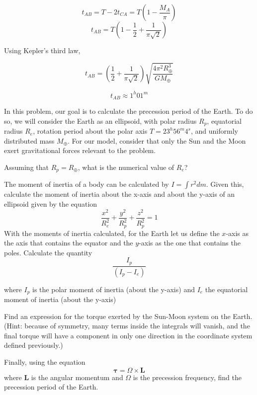 \documentclass[11pt]{article}
\begin{document}
\begin{pproblem}
\begin{pssolution*}{}{}
\begin{alternativas}
            \[t_{AB} = T - 2t_{CA} = T\left(1 - \frac{M_A}{\pi}\right)\]
            \[t_{AB} = T\left(1-\frac{1}{2}+\frac{1}{\pi\sqrt2}\right)\]

            Using Kepler's third law,

            \[t_{AB} = \left(\frac{1}{2}+\frac{1}{\pi\sqrt2}\right)\sqrt{\frac{4\pi^2R_{\oplus}^3}{GM_\oplus}} \]

            \[\boxed{t_{AB} \approx 1^h01^m}\]
            
      
        \end{alternativas}
    \end{pssolution*}
    
\end{pproblem}

\begin{pproblem}
    In this problem, our goal is to calculate the precession period of the Earth. To do so, we will consider the Earth as an ellipsoid, with polar radius $R_p$, equatorial radius $R_e$, rotation period about the polar axis $T = 23^h56^m4^s$, and uniformly distributed mass $M_\oplus$. For our model, consider that only the Sun and the Moon exert gravitational forces relevant to the problem.
    \begin{alternativas}
        \item Assuming that $R_p = R_\oplus$, what is the numerical value of $R_e$?
        
        \item The moment of inertia of a body can be calculated by $I = \int r^2 dm$. Given this, calculate the moment of inertia about the x-axis and about the y-axis of an ellipsoid given by the equation 
        $$\frac{x^2}{R_e^2} + \frac{y^2}{R_p^2} + \frac{z^2}{R_p^2}= 1$$
        With the moments of inertia calculated, for the Earth let us define the $x$-axis as the axis that contains the equator and the $y$-axis as the one that contains the poles. Calculate the quantity 
        $$\frac{I_p}{(I_p-I_e)}$$

        where $I_p$ is the polar moment of inertia (about the y-axis) and $I_e$ the equatorial moment of inertia (about the y-axis)
        

        \item Find an expression for the torque exerted by the Sun-Moon system on the Earth. (Hint: because of symmetry, many terms inside the integrals will vanish, and the final torque will have a component in only one direction in the coordinate system defined previously.)
        \item Finally, using the equation 
        $$\mathbf{\tau } = \Omega \times \mathbf{L} $$
        where $\mathbf{L}$ is the angular momentum and $\Omega$ is the precession frequency, find the precession period of the Earth.
    \end{alternativas}


\end{pproblem}
\end{document}
